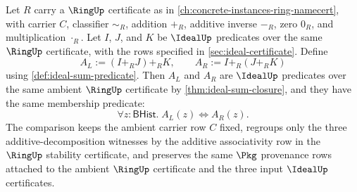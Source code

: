 \begin{theorem}
\label{thm:ideal-sum-associativity}
Let $R$ carry a $\RingUp$ certificate as in \autoref{ch:concrete-instances-ring-namecert}, with carrier $C$, classifier $\sim_R$, addition $+_R$, additive inverse $-_R$, zero $0_R$, and multiplication $\cdot_R$. Let $I$, $J$, and $K$ be $\IdealUp$ predicates over the same $\RingUp$ certificate, with the rows specified in \autoref{sec:ideal-certificate}. Define
$$
A_L:=(I+_RJ)+_RK,
\qquad
A_R:=I+_R(J+_RK)
$$
using \autoref{def:ideal-sum-predicate}. Then $A_L$ and $A_R$ are $\IdealUp$ predicates over the same ambient $\RingUp$ certificate by \autoref{thm:ideal-sum-closure}, and they have the same membership predicate:
$$
\forall z:\mathsf{BHist}.\; A_L(z)\Longleftrightarrow A_R(z).
$$
The comparison keeps the ambient carrier row $C$ fixed, regroups only the three additive-decomposition witnesses by the additive associativity row in the $\RingUp$ stability certificate, and preserves the same $\Pkg$ provenance rows attached to the ambient $\RingUp$ certificate and the three input $\IdealUp$ certificates.
\end{theorem}
